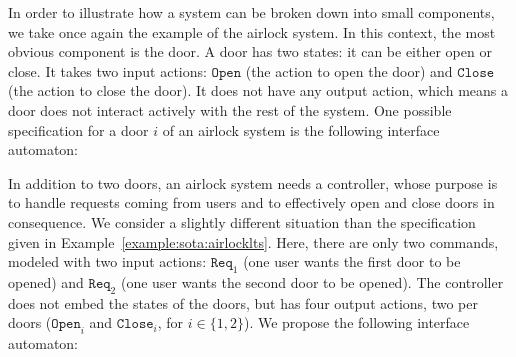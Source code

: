 \begin{example}
  \label{example:sota:airlockinterface}

  In order to illustrate how a system can be broken down into small components,
  we take once again the example of the airlock system.
  In this context, the most obvious component is the door.
  A door has two states: it can be either open or close.
  It takes two input actions: \( \mathtt{Open} \) (the action to open the door)
  and \( \mathtt{Close} \) (the action to close the door).
  It does not have any output action, which means a door does not interact
  actively with the rest of the system.
  One possible specification for a door $i$ of an airlock system is the
  following interface automaton:

  \begin{center}
  \end{center}

  In addition to two doors, an airlock system needs a controller, whose purpose
  is to handle requests coming from users and to effectively open and close
  doors in consequence.
  We consider a slightly different situation than the specification given in
  Example~\ref{example:sota:airlocklts}.
  Here, there are only two commands, modeled with two input actions:
  \( \mathtt{Req}_1 \) (one user wants the first door to be opened) and
  \( \mathtt{Req}_2 \) (one user wants the second door to be opened).
  The controller does not embed the states of the doors, but has four output
  actions, two per doors (\( \mathtt{Open}_i \) and \( \mathtt{Close}_i\), for
  \( i \in \{1, 2\}\)).
  We propose the following interface automaton:


\end{example}
